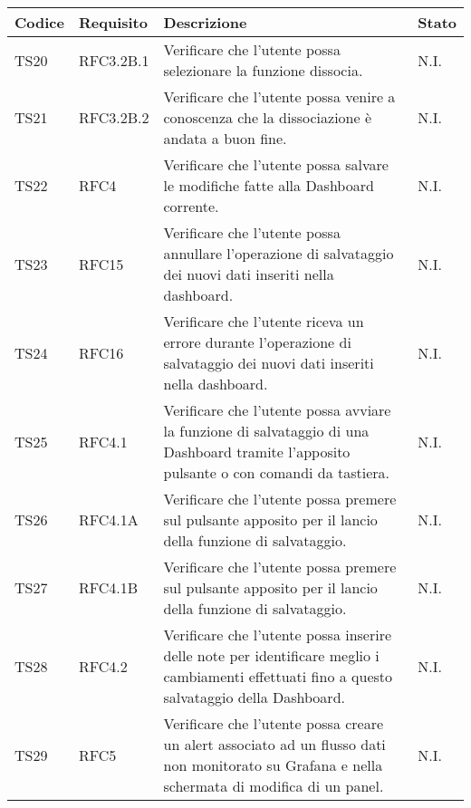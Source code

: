 \begin{table}[!htpb]
	\centering
	\renewcommand{\arraystretch}{2} 
	\begin{tabular}{|l|l|p{10cm}|l|}
		\rowcolor{orange!50}
		\hline
		\textbf{Codice} & \textbf{Requisito}& \textbf{Descrizione} & \textbf{Stato}\\ 
		\hline
		TS20 & RFC3.2B.1 &
			Verificare che l'utente possa selezionare la funzione dissocia. 
			& N.I.\\
		\hline
		TS21 & RFC3.2B.2 &
			Verificare che l'utente possa venire a conoscenza che la dissociazione è andata a buon fine. 
			& N.I.\\
		\hline
		TS22 & RFC4 &
			Verificare che l’utente possa salvare le modifiche fatte alla Dashboard corrente.
			& N.I.\\
		\hline
		TS23 & RFC15 &
			Verificare che l’utente possa annullare l'operazione di salvataggio dei nuovi dati inseriti nella dashboard.
			& N.I.\\
		\hline
		TS24 & RFC16 &
			Verificare che l’utente riceva un errore durante l'operazione di salvataggio dei nuovi dati inseriti nella dashboard. 
			& N.I.\\
		\hline
		TS25 & RFC4.1 &
			Verificare che l'utente possa avviare la funzione di salvataggio di una Dashboard tramite l’apposito pulsante o con comandi da tastiera.
			& N.I.\\
		\hline
		TS26 & RFC4.1A &
			Verificare che l'utente possa premere sul pulsante apposito per il lancio della funzione di salvataggio.
			& N.I.\\
		\hline
		TS27 & RFC4.1B &
			Verificare che l'utente possa premere sul pulsante apposito per il lancio della funzione di salvataggio.
			& N.I.\\
		\hline
		TS28 & RFC4.2 &
			Verificare che l'utente possa inserire delle note per identificare meglio i cambiamenti effettuati fino a questo salvataggio della Dashboard.
			& N.I.\\
		\hline
		TS29 & RFC5 &
			Verificare che l’utente possa creare un alert associato ad un flusso dati non monitorato su Grafana e nella schermata di modifica di un panel.
			& N.I.\\
		\hline
	\end{tabular}
\end{table}
